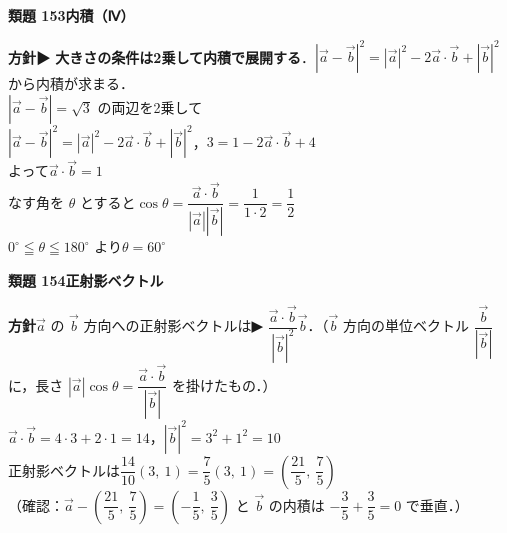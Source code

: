 \documentclass[a4paper,11pt]{ltjsarticle}
\newcommand{\ans}[2]{\Needspace{5\baselineskip}\vspace{6pt}%
  {\sffamily\bfseries 類題 #1\quad #2}\par}
\newcommand{\point}[1]{\textsf{\bfseries ▶ #1}}
\newcommand{\ax}[4]{\draw[->] (#1,0)--(#2,0) node[right]{\scriptsize $x$};
  \draw[->] (0,#3)--(0,#4) node[above]{\scriptsize $y$};
  \node[below left] at (0,0){\scriptsize O};}
\begin{document}
\ans{153}{内積（Ⅳ）}
\begin{kai}
\textbf{方針}\quad \point{大きさの条件は2乗して内積で展開する}．$|\vec a-\vec b|^2=|\vec a|^2-2\vec a\cdot\vec b+|\vec b|^2$ から内積が求まる．\\[2pt]
$|\vec a-\vec b|=\sqrt3$ の両辺を2乗して\\
\hspace*{1.5em}$|\vec a-\vec b|^2=|\vec a|^2-2\vec a\cdot\vec b+|\vec b|^2$，\quad $3=1-2\vec a\cdot\vec b+4$\\
よって\quad $\vec a\cdot\vec b=1$\\[2pt]
なす角を $\theta$ とすると\quad $\cos\theta=\dfrac{\vec a\cdot\vec b}{|\vec a||\vec b|}=\dfrac{1}{1\cdot2}=\dfrac12$\\
$0^\circ\leqq\theta\leqq180^\circ$ より\quad $\theta=60^\circ$
\end{kai}

\ans{154}{正射影ベクトル}
\begin{kai}
\textbf{方針}\quad $\vec a$ の $\vec b$ 方向への正射影ベクトルは\point{$\dfrac{\vec a\cdot\vec b}{|\vec b|^2}\vec b$}．（$\vec b$ 方向の単位ベクトル $\dfrac{\vec b}{|\vec b|}$ に，長さ $|\vec a|\cos\theta=\dfrac{\vec a\cdot\vec b}{|\vec b|}$ を掛けたもの．）\\[2pt]
$\vec a\cdot\vec b=4\cdot3+2\cdot1=14$，\quad $|\vec b|^2=3^2+1^2=10$\\
正射影ベクトルは\quad $\dfrac{14}{10}(3,\ 1)=\dfrac75(3,\ 1)=\left(\dfrac{21}5,\ \dfrac75\right)$\\[2pt]
（確認：$\vec a-\left(\dfrac{21}5,\ \dfrac75\right)=\left(-\dfrac15,\ \dfrac35\right)$ と $\vec b$ の内積は $-\dfrac35+\dfrac35=0$ で垂直．）
\begin{center}
\end{center}
\end{kai}
\end{document}
